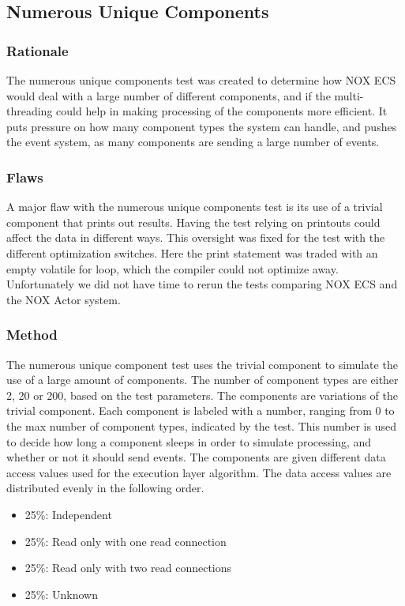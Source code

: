 \subsection{Numerous Unique Components}
\subsubsection{Rationale}
The numerous unique components test was created to determine how NOX ECS would deal with a large number of different components,
and if the multi-threading could help in making processing of the components more efficient.
It puts pressure on how many component types the system can handle, and pushes the event system, as many components are sending a large number of events.

\subsubsection{Flaws}
A major flaw with the numerous unique components test is its use of a trivial component that prints out results.
Having the test relying on printouts could affect the data in different ways.
This oversight was fixed for the test with the different optimization switches.
Here the print statement was traded with an empty volatile for loop, which the compiler could not optimize away.
Unfortunately we did not have time to rerun the tests comparing NOX ECS and the NOX Actor system.

\subsubsection{Method}
The numerous unique component test uses the trivial component to simulate the use of a large amount of components.
The number of component types are either 2, 20 or 200, based on the test parameters. The components are variations of the trivial component.
Each component is labeled with a number, ranging from 0 to the max number of component types, indicated by the test.
This number is used to decide how long a component sleeps in order to simulate processing, and whether or not it should send events.
The components are given different data access values used for the execution layer algorithm.
The data access values are distributed evenly in the following order.
\begin{itemize}
    \item 25\%: Independent
    \item 25\%: Read only with one read connection
    \item 25\%: Read only with two read connections
    \item 25\%: Unknown
\end{itemize}

